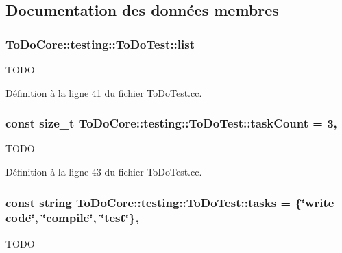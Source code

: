 \subsection{Documentation des données membres}
\hypertarget{class_to_do_core_1_1testing_1_1_to_do_test_aa574f1ef8dce28e299d993d06a0bbba9}{
\subsubsection[{list}]{ To\+Do\+Core\+::testing\+::\+To\+Do\+Test\+::list\hspace{0.3cm}{\ttfamily [protected]}}}\label{class_to_do_core_1_1testing_1_1_to_do_test_aa574f1ef8dce28e299d993d06a0bbba9}
T\+O\+D\+O 

Définition à la ligne 41 du fichier To\+Do\+Test.\+cc.

\hypertarget{class_to_do_core_1_1testing_1_1_to_do_test_a9f8905b1176e6183f287ab0afe296a3c}{
\subsubsection[{task\+Count}]{\setlength{\rightskip}{0pt plus 5cm}const size\+\_\+t To\+Do\+Core\+::testing\+::\+To\+Do\+Test\+::task\+Count = 3\hspace{0.3cm}{\ttfamily [static]}, {\ttfamily [protected]}}}\label{class_to_do_core_1_1testing_1_1_to_do_test_a9f8905b1176e6183f287ab0afe296a3c}
T\+O\+D\+O 

Définition à la ligne 43 du fichier To\+Do\+Test.\+cc.

\hypertarget{class_to_do_core_1_1testing_1_1_to_do_test_a6ef770d8f95f609e100d585c0635f3d7}{
\subsubsection[{tasks}]{\setlength{\rightskip}{0pt plus 5cm}const string To\+Do\+Core\+::testing\+::\+To\+Do\+Test\+::tasks = \{\char`\"{}write code\char`\"{}, \char`\"{}compile\char`\"{}, \char`\"{}test\char`\"{}\}\hspace{0.3cm}{\ttfamily [static]}, {\ttfamily [protected]}}}\label{class_to_do_core_1_1testing_1_1_to_do_test_a6ef770d8f95f609e100d585c0635f3d7}
T\+O\+D\+O 

